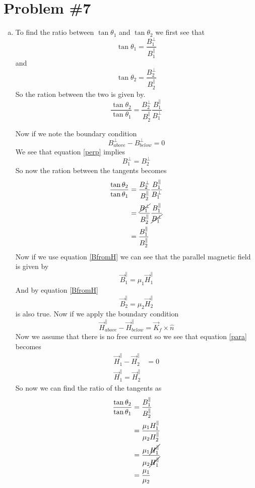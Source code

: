 \documentclass[11pt]{article}
\numberwithin{equation}{section}
\begin{document}
\section{Problem \#7}
\begin{enumerate}[(a)]
\item
To find the ratio between $\tan\theta_1$ and $\tan\theta_2$ we first see that
$$\tan\theta_1 = \frac{B_1^{\perp}}{B_1^{\parallel}}$$
and
$$\tan\theta_2 = \frac{B_2^{\perp}}{B_2^{\parallel}}$$
So the ration between the two is given by. 
$$\frac{\tan\theta_2}{\tan\theta_1}  = \frac{B_2^{\perp}}{B_2^{\parallel}}\frac{B_1^{\parallel}}{B_1^{\perp}}$$

Now if we note the boundary condition 
\begin{equation}
B_{above}^{\perp} - B_{below}^{\perp} = 0
\label{perp}
\end{equation}
We see that equation \ref{perp} implies 
$$B_{1}^{\perp} = B_{2}^{\perp} $$
So now the ration between the tangents becomes
\begin{align*}
\frac{\tan\theta_2}{\tan\theta_1}  &= \frac{B_2^{\perp}}{B_2^{\parallel}}\frac{B_1^{\parallel}}{B_1^{\perp}}\\
&= \frac{\cancel{B_1^{\perp}}}{B_2^{\parallel}}\frac{B_1^{\parallel}}{\cancel{B_1^{\perp}}}\\
&= \frac{B_1^{\parallel}}{B_2^{\parallel}}
\end{align*}
Now if we use equation \ref{BfromH} we can see that the parallel magnetic field is given by
$$\vec{B}_1^{\parallel} = \mu_1\vec{H}_1^{\parallel}$$
And by equation \ref{BfromH} 
$$\vec{B}_2^{\parallel}  = {\mu_2}\vec{H}_2^{\parallel}$$
is also true. Now if we apply the boundary condition
\begin{equation}
\vec{H}_{above}^{\parallel} - \vec{H}_{below}^{\parallel} = \vec{K}_f\times\hat{n}
\label{para}
\end{equation}
Now we assume that there is no free current so we see that equation \ref{para} becomes
\begin{align*}
\vec{H}_{1}^{\parallel} - \vec{H}_{2}^{\parallel} &= 0\\
\vec{H}_{1}^{\parallel} = \vec{H}_{2}^{\parallel} 
\end{align*}
So now we can find the ratio of the tangents as
\begin{align*}
\frac{\tan\theta_2}{\tan\theta_1} &= \frac{B_1^{\parallel}}{B_2^{\parallel}}\\
&= \frac{\mu_1H_1^{\parallel}}{\mu_2H_2^{\parallel}}\\
&= \frac{\mu_1\cancel{H_1^{\parallel}}}{\mu_2\cancel{H_1^{\parallel}}}\\
&= \frac{\mu_1}{\mu_2}
\end{align*}


\end{enumerate}
\end{document}
